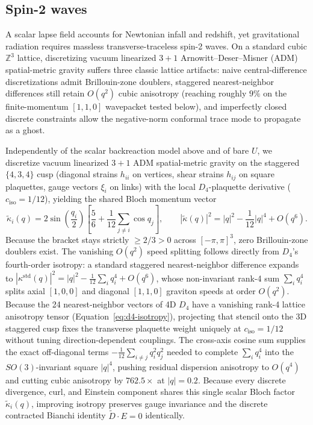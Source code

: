 \subsection{Spin-2 waves}

A scalar lapse field accounts for Newtonian infall and redshift, yet gravitational radiation requires massless
transverse-traceless spin-2 waves. On a standard cubic $\mathbb{Z}^3$ lattice, discretizing vacuum linearized $3+1$
Arnowitt--Deser--Misner (ADM) spatial-metric gravity suffers three classic lattice artifacts: naive central-difference
discretizations admit Brillouin-zone doublers, staggered nearest-neighbor differences still retain $O(q^2)$ cubic
anisotropy (reaching roughly $9\%$ on the finite-momentum $[1,1,0]$ wavepacket tested below), and imperfectly closed
discrete constraints allow the negative-norm conformal trace mode to propagate as a ghost.

Independently of the scalar backreaction model above and of bare $U$, we discretize vacuum linearized $3+1$ ADM
spatial-metric gravity on the staggered $\{4,3,4\}$ cusp (diagonal strains $h_{ii}$ on vertices, shear strains $h_{ij}$
on square plaquettes, gauge vectors $\xi_i$ on links) with the local $D_4$-plaquette derivative ($c_{\mathrm{iso}} =
1/12$), yielding the shared Bloch momentum vector
\begin{equation}
\tilde{\kappa}_i(q) = 2\sin\!\left(\frac{q_i}{2}\right)\left[\frac{5}{6} + \frac{1}{12}\sum_{j \neq i}\cos q_j\right],
\qquad
|\tilde{\kappa}(q)|^2 = |q|^2 - \frac{1}{12}|q|^4 + O(q^6).
\label{eq:spin2-d4}
\end{equation}
Because the bracket stays strictly $\ge 2/3 > 0$ across $[-\pi, \pi]^3$, zero Brillouin-zone doublers exist. The
vanishing $O(q^2)$ speed splitting follows directly from $D_4$'s fourth-order isotropy: a standard staggered
nearest-neighbor difference expands to $|\kappa^{\mathrm{std}}(q)|^2 = |q|^2 - \frac{1}{12}\sum_i q_i^4 + O(q^6)$,
whose non-invariant rank-4 sum $\sum_i q_i^4$ splits axial $[1,0,0]$ and diagonal $[1,1,0]$ graviton speeds at order
$O(q^2)$. Because the 24 nearest-neighbor vectors of 4D $D_4$ have a vanishing rank-4 lattice anisotropy tensor
(Equation~\eqref{eq:d4-isotropy}), projecting that stencil onto the 3D staggered cusp fixes the transverse plaquette
weight uniquely at $c_{\mathrm{iso}} = 1/12$ without tuning direction-dependent couplings. The cross-axis cosine sum
supplies the exact off-diagonal terms $-\frac{1}{12}\sum_{i \neq j} q_i^2 q_j^2$ needed to complete $\sum_i q_i^4$ into
the $SO(3)$-invariant square $|q|^4$, pushing residual dispersion anisotropy to $O(q^4)$ and cutting cubic anisotropy by
$762.5\times$ at $|q| = 0.2$. Because every discrete divergence, curl, and Einstein component shares this single scalar
Bloch factor $\tilde{\kappa}_i(q)$, improving isotropy preserves gauge invariance and the discrete contracted Bianchi
identity $\tilde{D} \cdot E = 0$ identically.

